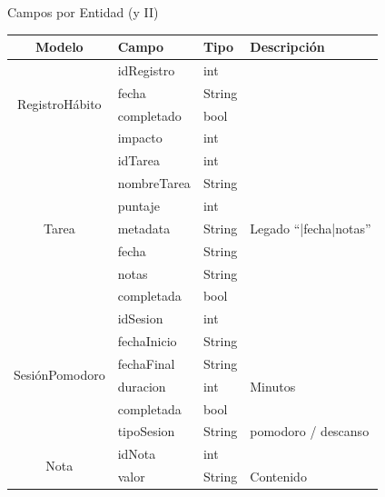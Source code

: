\documentclass[11pt,landscape]{beamer}
\begin{document}
\begin{frame}{Campos por Entidad (y II)}
  \centering
  \begin{tabular}{clll}
    \toprule
    \rowcolor{black!45}
    \textbf{Modelo} & \textbf{Campo} & \textbf{Tipo} & \textbf{Descripción} \\
    \midrule
    \multirow{4}{*}{RegistroHábito} & idRegistro & int & \\
     & fecha & String & \\
     & completado & bool & \\
     & impacto & int & \\
    \midrule
    \multirow{7}{*}{Tarea} & idTarea & int & \\
     & nombreTarea & String & \\
     & puntaje & int & \\
     & metadata & String & Legado ``|fecha|notas'' \\
     & fecha & String & \\
     & notas & String & \\
     & completada & bool & \\
    \midrule
    \multirow{6}{*}{SesiónPomodoro} & idSesion & int & \\
     & fechaInicio & String & \\
     & fechaFinal & String & \\
     & duracion & int & Minutos \\
     & completada & bool & \\
     & tipoSesion & String & pomodoro / descanso \\
    \midrule
    \multirow{2}{*}{Nota} & idNota & int & \\
     & valor & String & Contenido \\
    \bottomrule
  \end{tabular}
\end{frame}
\end{document}
